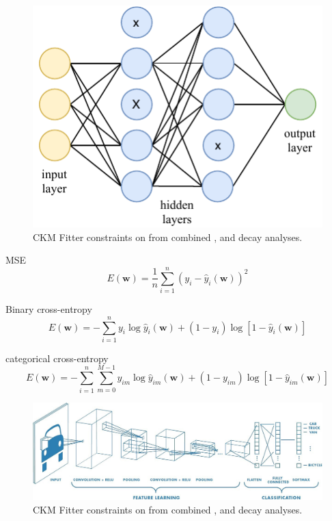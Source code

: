 \begin{figure}
    \includegraphics[width=\largefigwidth]{diagrams/6-cvn/dropout.pdf}
    \caption[CKM Fitter constraints on \alphaCKM.]%
    {CKM Fitter constraints on \alphaCKM from combined \BToPiPi,
        \BToRhoPi and \BToRhoRho decay analyses.}
    \label{fig:dropout}
\end{figure}


MSE
\begin{equation}
    E(\boldsymbol{w})=\frac{1}{n}\displaystyle\sum_{i=1}^{n}(y_{i}-\hat{y}_{i}(\boldsymbol{w}))^{2}
\end{equation}

Binary cross-entropy
\begin{equation}
    E(\boldsymbol{w})=-\displaystyle\sum_{i=1}^{n}y_{i}\log\hat{y}_{i}(\boldsymbol{w})+(1-y_{i})\log[1-\hat{y}_{i}(\boldsymbol{w})]
\end{equation}

categorical cross-entropy
\begin{equation}
    E(\boldsymbol{w})=-\displaystyle\sum_{i=1}^{n}\displaystyle\sum_{m=0}^{M-1}y_{im}\log\hat{y}_{im}(\boldsymbol{w})+(1-y_{im})\log[1-\hat{y}_{im}(\boldsymbol{w})]
\end{equation}

\begin{figure}
    \includegraphics[width=\textwidth]{diagrams/6-cvn/conv_diagram.jpeg}
    \caption[CKM Fitter constraints on \alphaCKM.]%
    {CKM Fitter constraints on \alphaCKM from combined \BToPiPi,
        \BToRhoPi and \BToRhoRho decay analyses.}
    \label{fig:conv_diagram}
\end{figure}

